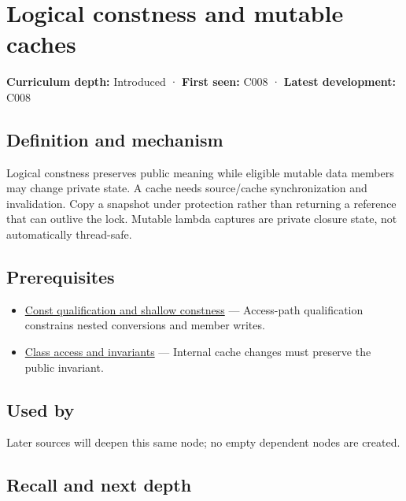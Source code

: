 \hypertarget{appendix-f5593256bcaf}{}
\section{Logical constness and mutable caches}\label{appendix-f5593256bcaf-logical-constness-and-mutable-caches}

\textbf{Curriculum depth:} Introduced · \textbf{First seen:} C008 · \textbf{Latest development:} C008

\subsection{Definition and mechanism}\label{appendix-f5593256bcaf-definition-and-mechanism}

Logical constness preserves public meaning while eligible mutable data members may change private state. A cache needs source/cache synchronization and invalidation. Copy a snapshot under protection rather than returning a reference that can outlive the lock. Mutable lambda captures are private closure state, not automatically thread-safe.

\subsection{Prerequisites}\label{appendix-f5593256bcaf-prerequisites}

\begin{itemize}
\tightlist
\item
  \hyperref[appendix-c25d60fed375]{Const qualification and shallow constness} --- Access-path qualification constrains nested conversions and member writes.
\item
  \hyperref[appendix-8e5214819615]{Class access and invariants} --- Internal cache changes must preserve the public invariant.
\end{itemize}

\subsection{Used by}\label{appendix-f5593256bcaf-used-by}

Later sources will deepen this same node; no empty dependent nodes are created.

\subsection{Recall and next depth}\label{appendix-f5593256bcaf-recall-and-next-depth}

